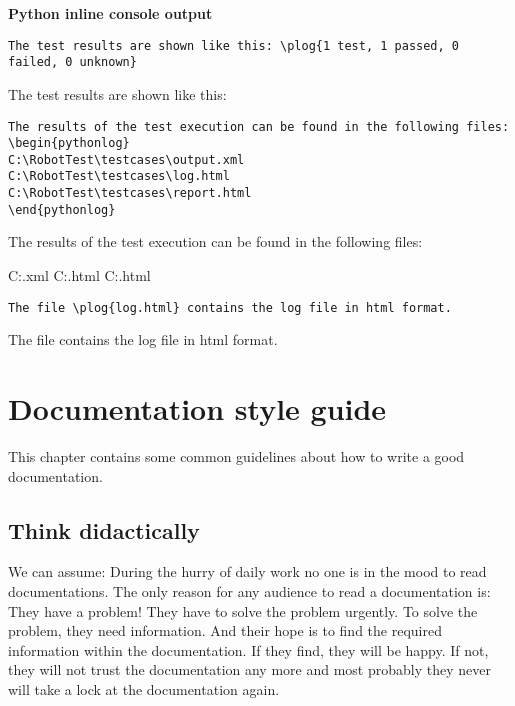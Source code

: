 \documentclass[a4paper,10pt]{report}
\begin{document}
\vspace{2ex}

\textbf{Python inline console output}
\begin{verbatim}
The test results are shown like this: \plog{1 test, 1 passed, 0 failed, 0 unknown}
\end{verbatim}

The test results are shown like this: 

\vspace{2ex}

\begin{verbatim}
The results of the test execution can be found in the following files:
\begin{pythonlog}
C:\RobotTest\testcases\output.xml
C:\RobotTest\testcases\log.html
C:\RobotTest\testcases\report.html
\end{pythonlog}
\end{verbatim}

The results of the test execution can be found in the following files:
\begin{pythonlog}
C:\RobotTest\testcases\output.xml
C:\RobotTest\testcases\log.html
C:\RobotTest\testcases\report.html
\end{pythonlog}

\vspace{2ex}

\begin{verbatim}
The file \plog{log.html} contains the log file in html format.
\end{verbatim}

The file  contains the log file in html format.


\newpage

\chapter{Documentation style guide}

This chapter contains some common guidelines about how to write a good documentation.

\section{Think didactically}

We can assume: During the hurry of daily work no one is in the mood to read documentations.
The only reason for any audience to read a documentation is: They have a problem! They have to solve the problem urgently.
To solve the problem, they need information. And their hope is to find the required information within the documentation.
If they find, they will be happy. If not, they will not trust the documentation any more and most probably they never will take a lock at the documentation again.
\end{document}
